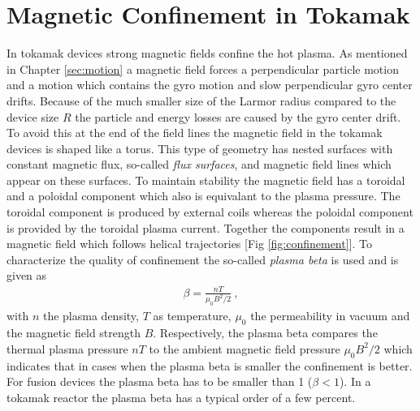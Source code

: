 \newpage
\section{Magnetic Confinement in Tokamak}
\label{sec:confinement}

In tokamak devices strong magnetic fields confine the hot plasma. As mentioned in Chapter \ref{sec:motion} a magnetic field forces a perpendicular particle motion and a motion which contains the gyro motion and slow perpendicular gyro center drifts. Because of the much smaller size of the Larmor radius compared to the device size $R$ the particle and energy losses are caused by the gyro center drift. To avoid this at the end of the field lines the magnetic field in the tokamak devices is shaped like a torus. This type of geometry has nested surfaces with constant magnetic flux, so-called \textit{flux surfaces}, and magnetic field lines which appear on these surfaces. To maintain stability the magnetic field has a toroidal and a poloidal component which also is equivalant to the plasma pressure. \cite{Stroth2011, Wesson2011} The toroidal component is produced by external coils whereas the poloidal component is provided by the toroidal plasma current. Together the components result in a magnetic field which follows helical trajectories [Fig \ref{fig:confinement}]. To characterize the quality of confinement the so-called \textit{plasma beta} is used and is given as
\begin{gather}
    \beta = \frac{nT}{\mu_0 B^2/2}~,
\end{gather} 
with $n$ the plasma density, $T$ as temperature, $\mu_0$ the permeability in vacuum and the magnetic field strength $B$. Respectively, the plasma beta compares the thermal plasma pressure $nT$ to the ambient magnetic field pressure $\mu_0 B^2/2$ which indicates that in cases when the plasma beta is smaller the confinement is better. For fusion devices the plasma beta has to be smaller than 1 ($\beta < 1$). In a tokamak reactor the plasma beta has a typical order of a few percent. \cite{Wesson2011}
